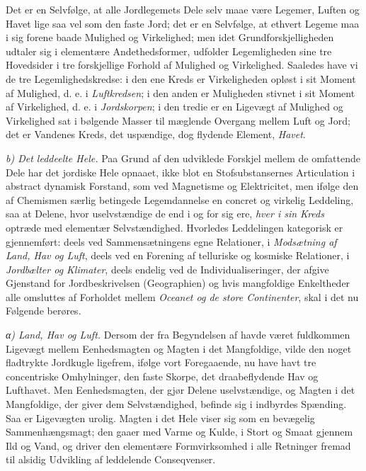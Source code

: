 \documentclass[12pt,a4paper]{book}
\newcommand{\runin}[1]{\emph{#1}\hspace{0.4em}}
\newcommand{\subrunin}[1]{\emph{#1}\hspace{0.4em}}
\begin{document}
Det er en Selvfølge, at alle Jordlegemets Dele selv maae være Legemer,
Luften og Havet lige saa vel som den faste Jord; det er en Selvfølge, at
ethvert Legeme maa i sig forene baade Mulighed og Virkelighed; men idet
Grundforskjelligheden udtaler sig i elementære Andethedsformer, udfolder
Legemligheden sine tre Hovedsider i tre forskjellige Forhold af Mulighed
og Virkelighed. Saaledes have vi de tre Legemlighedskredse: i den ene
Kreds er Virkeligheden opløst i sit Moment af Mulighed, d. e. i
\emph{Luftkredsen}; i den anden er Muligheden stivnet i sit Moment af
Virkelighed, d. e. i \emph{Jordskorpen}; i den tredie er en Ligevægt af
Mulighed og Virkelighed sat i bølgende Masser til mæglende Overgang
mellem Luft og Jord; det er Vandenes Kreds, det uspændige, dog flydende
Element, \emph{Havet}.

\runin{b) Det leddeelte Hele.} Paa Grund af den udviklede Forskjel mellem
de omfattende Dele har det jordiske Hele opnaaet, ikke blot en
Stofsubstansernes Articulation i abstract dynamisk Forstand, som ved
Magnetisme og Elektricitet, men ifølge den af Chemismen særlig betingede
Legemdannelse en concret og virkelig Leddeling, saa at Delene,
hvor uselvstændige de end i og for sig ere, \emph{hver i sin Kreds}
optræde med elementær Selvstændighed. Hvorledes Leddelingen kategorisk er
gjennemført: deels ved Sammensætningens egne Relationer, i
\emph{Modsætning af Land, Hav og Luft}, deels ved en Forening af
telluriske og kosmiske Relationer, i \emph{Jordbælter og Klimater}, deels
endelig ved de Individualiseringer, der afgive Gjenstand for
Jordbeskrivelsen (Geographien) og hvis mangfoldige Enkeltheder alle
omsluttes af Forholdet mellem \emph{Oceanet og de store Continenter},
skal i det nu Følgende berøres.

\subrunin{α) Land, Hav og Luft.} Dersom der fra Begyndelsen af havde
været fuldkommen Ligevægt mellem Eenhedsmagten og Magten i det
Mangfoldige, vilde den noget fladtrykte Jordkugle ligefrem, ifølge vort
Foregaaende, nu have havt tre concentriske Omhylninger, den faste Skorpe,
det draabeflydende Hav og Lufthavet. Men Eenhedsmagten, der gjør Delene
uselvstændige, og Magten i det Mangfoldige, der giver dem
Selvstændighed, befinde sig i indbyrdes Spænding. Saa er Ligevægten
urolig. Magten i det Hele viser sig som en bevægelig Sammenhængsmagt; den
gaaer med Varme og Kulde, i Stort og Smaat gjennem Ild og Vand, og driver
den elementære Formvirksomhed i alle Retninger fremad til alsidig
Udvikling af leddelende Conseqvenser.
\end{document}

